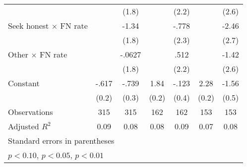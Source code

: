 \begin{table}[H]
\begin{tabular}{l*{6}{c}}
                &                  &    (1.8)         &                  &    (2.2)         &                  &    (2.6)         \\
Seek honest $\times$ FN rate&                  &    -1.34         &                  &    -.778         &                  &    -2.46         \\
                &                  &    (1.8)         &                  &    (2.3)         &                  &    (2.7)         \\
Other $\times$ FN rate&                  &   -.0627         &                  &     .512         &                  &    -1.42         \\
                &                  &    (1.8)         &                  &    (2.2)         &                  &    (2.6)         \\
Constant        &    -.617\sym{***}&    -.739\sym{**} &     1.84\sym{***}&    -.123         &     2.28\sym{***}&    -1.56\sym{***}\\
                &    (0.2)         &    (0.3)         &    (0.2)         &    (0.4)         &    (0.2)         &    (0.5)         \\
\hline
Observations    &      315         &      315         &      162         &      162         &      153         &      153         \\
Adjusted \(R^{2}\)&     0.09         &     0.08         &     0.08         &     0.09         &     0.07         &     0.08         \\
\hline\hline
\multicolumn{7}{l}{\footnotesize Standard errors in parentheses}\\
\multicolumn{7}{l}{\footnotesize \sym{*} \(p<0.10\), \sym{**} \(p<0.05\), \sym{***} \(p<0.01\)}\\
\end{tabular}
\end{table}
